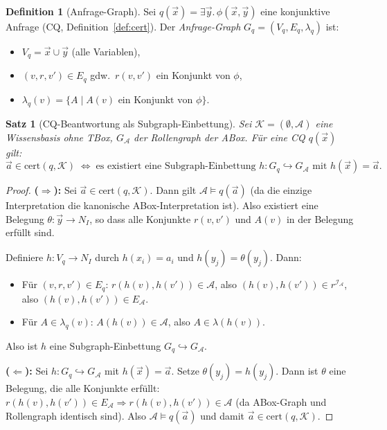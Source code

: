 ﻿\documentclass[a4paper,12pt]{article}
\theoremstyle{definition}
\newtheorem{definition}{Definition}[section]
\theoremstyle{plain}
\newtheorem{satz}{Satz}[section]
\theoremstyle{remark}
\newcommand{\Abox}{\ensuremath{\mathcal{A}}}
\newcommand{\KB}{\ensuremath{\mathcal{K}}}
\newcommand{\interp}[1]{\ensuremath{\mathcal{#1}}}
\begin{document}
\begin{definition}[Anfrage-Graph]
\label{def:anfragegraph}
Sei $q(\vec{x}) = \exists \vec{y}.\, \phi(\vec{x}, \vec{y})$ eine
konjunktive Anfrage (CQ, Definition~\ref{def:cert}).
Der \emph{Anfrage-Graph} $G_q = (V_q, E_q, \lambda_q)$ ist:
\begin{itemize}
  \item $V_q = \vec{x} \cup \vec{y}$ (alle Variablen),
  \item $(v, r, v') \in E_q$ gdw.\ $r(v, v')$ ein Konjunkt von $\phi$,
  \item $\lambda_q(v) = \{A \mid A(v) \text{ ein Konjunkt von } \phi\}$.
\end{itemize}
\end{definition}

\begin{satz}[CQ-Beantwortung als Subgraph-Einbettung]
\label{satz:cq-subgraph}
Sei $\KB = (\emptyset, \Abox)$ eine Wissensbasis ohne TBox,
$G_\Abox$ der Rollengraph der ABox.
F{\"u}r eine CQ $q(\vec{x})$ gilt:
\[
  \vec{a} \in \mathrm{cert}(q, \KB)
  \;\iff\;
  \text{es existiert eine Subgraph-Einbettung }
  h: G_q \hookrightarrow G_\Abox
  \text{ mit } h(\vec{x}) = \vec{a}.
\]
\end{satz}

\begin{proof}
\textbf{($\Rightarrow$):}
Sei $\vec{a} \in \mathrm{cert}(q, \KB)$.
Dann gilt $\Abox \models q(\vec{a})$ (da die einzige Interpretation
die kanonische ABox-Interpretation ist).
Also existiert eine Belegung $\theta: \vec{y} \to N_I$, so dass
alle Konjunkte $r(v,v')$ und $A(v)$ in der Belegung erf{\"u}llt sind.

Definiere $h: V_q \to N_I$ durch $h(x_i) = a_i$ und $h(y_j) = \theta(y_j)$.
Dann:
\begin{itemize}
  \item F{\"u}r $(v, r, v') \in E_q$: $r(h(v), h(v')) \in \Abox$,
        also $(h(v), h(v')) \in r^{\interp{I_\Abox}}$,
        also $(h(v), h(v')) \in E_\Abox$. \checkmark
  \item F{\"u}r $A \in \lambda_q(v)$: $A(h(v)) \in \Abox$,
        also $A \in \lambda(h(v))$. \checkmark
\end{itemize}
Also ist $h$ eine Subgraph-Einbettung $G_q \hookrightarrow G_\Abox$.

\textbf{($\Leftarrow$):}
Sei $h: G_q \hookrightarrow G_\Abox$ mit $h(\vec{x}) = \vec{a}$.
Setze $\theta(y_j) = h(y_j)$.
Dann ist $\theta$ eine Belegung, die alle Konjunkte erf{\"u}llt:
$r(h(v), h(v')) \in E_\Abox \Rightarrow r(h(v), h(v')) \in \Abox$
(da ABox-Graph und Rollengraph identisch sind).
Also $\Abox \models q(\vec{a})$ und damit $\vec{a} \in \mathrm{cert}(q, \KB)$.
\qedhere
\end{proof}
\end{document}
